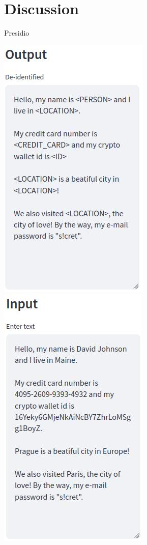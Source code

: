 \documentclass[12pt,aspectratio=169,handout]{beamer}
\begin{document}
\section{Discussion}

\begin{frame}{Presidio}

\includegraphics[width=0.38\linewidth]{img/presidio-out}
\pause
\includegraphics[width=0.38\linewidth]{img/presidio-in}

\end{frame}
\end{document}
